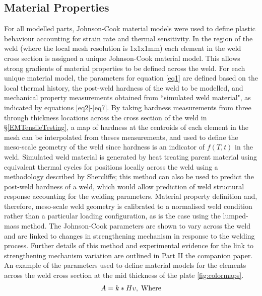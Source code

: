 \subsection{Material Properties}
\label{FEMaterialProperties}
For all modelled parts, Johnson-Cook material models were used to define plastic behaviour accounting for strain rate and thermal sensitivity. In the region of the weld (where the local mesh resolution is 1x1x1mm) each element in the weld cross section is assigned a unique Johnson-Cook material model. This allows strong gradients of material properties to be defined across the weld. For each unique material model, the parameters for equation \ref{eq1} are defined based on the local thermal history, the post-weld hardness of the weld to be modelled, and mechanical property measurements obtained from ``simulated weld material", as indicated by equations \ref{eq2}-\ref{eq7}. By taking hardness measurements from three through thickness locations across the cross section of the weld in \S\ref{EMTensileTesting}, a map of hardness at the centroids of each element in the mesh can be interpolated from theses measurements, and used to define the meso-scale geometry of the weld since hardness is an indicator of $f(T,t)$ in the weld. Simulated weld material is generated by heat treating parent material using equivalent thermal cycles for positions locally across the weld using a methodology described by Shercliffe; this method can also be used to predict the post-weld hardness of a weld, which would allow prediction of weld structural response accounting for the welding parameters. Material property definition and, therefore, meso-scale weld geometry is calibrated to a normalised weld condition rather than a particular loading configuration, as is the case using the lumped-mass method. The Johnson-Cook parameters are shown to vary across the weld and are linked to changes in strengthening mechanism in response to the welding process. Further details of this method and experimental evidence for the link to strengthening mechanism variation are outlined in Part II the companion paper. An example of the parameters used to define material models for the elements across the weld cross section at the mid thickness of the plate \ref{fig:colormaps}.
\begin{equation}
\label{eq2}
A=k*Hv, \textrm{\;Where}
\end{equation}
